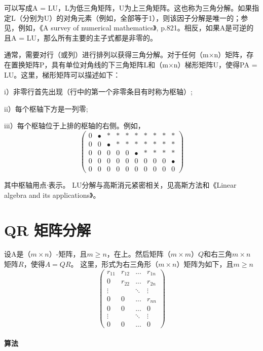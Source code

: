 \documentclass{ctexrep}
\begin{document}
可以写成A = LU，L为低三角矩阵，U为上三角矩阵。这也称为三角分解。如果指定L（分别为U）的对角元素（例如，全部等于1），则该因子分解是唯一的；参见，例如，《A survey of numerical mathematics》, p.821。相反，如果A是可逆的且A = LU，那么所有主要的主子式都是非零的。

通常，需要对行（或列）进行排列以获得三角分解。对于任何（m×n）矩阵，存在置换矩阵P，具有单位对角线的下三角矩阵L和（m×n）梯形矩阵U，使得PA = LU。这里，梯形矩阵可以描述如下：

i）非零行首先出现（行中的第一个非零条目有时称为枢轴）;

ii）每个枢轴下方是一列零;

iii）每个枢轴位于上排的枢轴的右侧。例如，
\begin{equation}
\begin{pmatrix}
0 &\bullet & * & * & * & * & * & * & * &* \\
0 & 0 & \bullet & * & * & * & * &* &* &* \\
0 & 0 & 0 & 0 & 0 & \bullet & * & * & * & * \\
0 & 0 &0 & 0 & 0 &0 & 0 & 0 & 0 &\bullet \\
0& 0& 0 & 0 & 0 & 0 &0 & 0 & 0 & 0
\end{pmatrix}    
\end{equation}


其中枢轴用点∙表示。 LU分解与高斯消元紧密相关，见高斯方法和《Linear algebra and its applications》。

\section{QR 矩阵分解}
设A是$（m×n）$-矩阵，且$m\ge n$，在上。然后矩阵$（m×m）Q$和右三角$m×n$ 矩阵$R$，使得$A = QR$。 这里，形式为右三角形$（m×n）$矩阵为如下，且$m\ge n$
\begin{equation}
\begin{pmatrix}
r_{11} & r_{12} & ... &r_{1n} \\ 
0 &  r_{22} & ... &r_{2n} \\ 
\vdots  &  & \ddots & \vdots\\ 
0 & 0 & ... & r_{nn}\\ 
0 & 0 & ... & 0\\ 
 \vdots &  & \ddots  &  \vdots\\ 
0 & 0 & ... & 0
\end{pmatrix}    
\end{equation}

\paragraph{算法}
\end{document}
